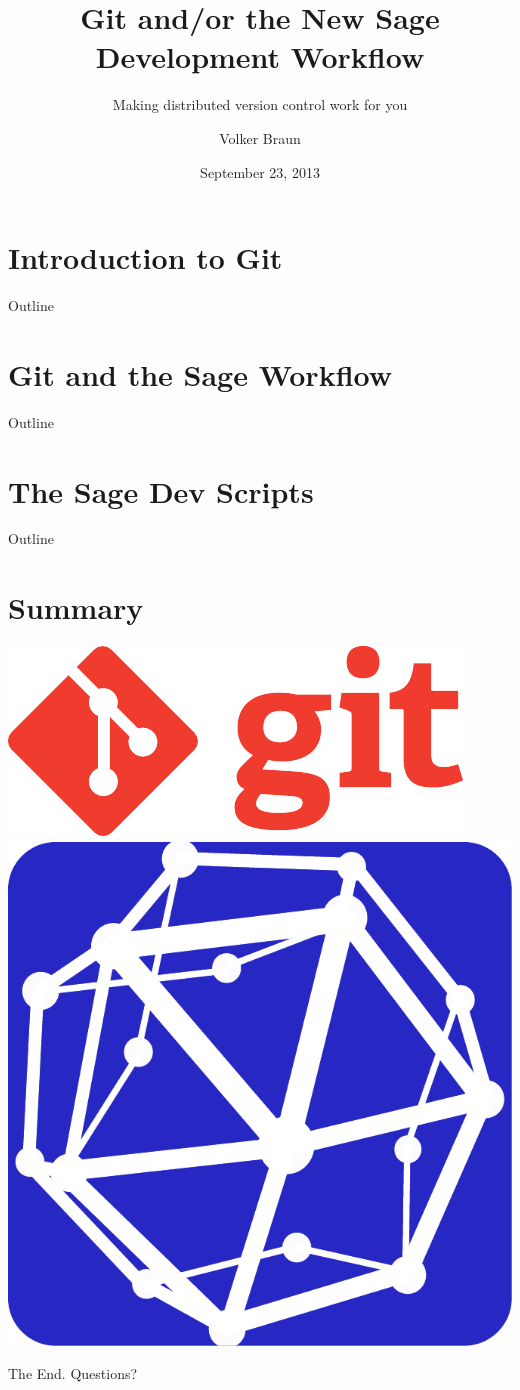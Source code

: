 \documentclass[11pt,handout]{beamer}
\author{Volker Braun}
\title{Git and/or the New Sage Development Workflow}
\subtitle{Making distributed version control work for you}
\institute{Oxford University}
\date{September 23, 2013}
\begin{document}
\begin{frame}[plain]
	\titlepage
\end{frame}

\section{Introduction to Git}
\begin{frame}{Outline}
	\tableofcontents
\end{frame}









\section{Git and the Sage Workflow}
\begin{frame}{Outline}
	\tableofcontents
\end{frame}





\section{The Sage Dev Scripts}
\begin{frame}{Outline}
	\tableofcontents
\end{frame}





\section{Summary}

\begin{frame}
  \includegraphics[width=0.6\linewidth]{images/git_logo}
  \hfill
  \includegraphics[width=0.3\linewidth]{images/sagemath_icon}
  \hfill
  \vspace{1cm}

  \begin{center}
    \Huge
    The End. Questions?
  \end{center}
\end{frame}
\end{document}
